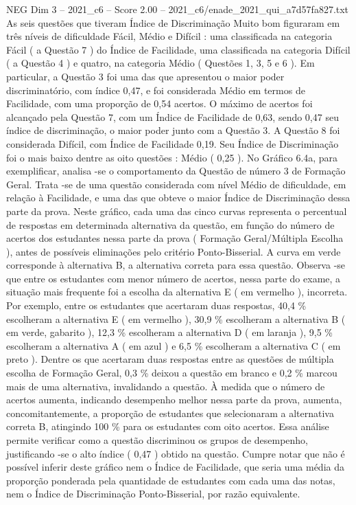 \begin{textsample}{NEG Dim 3 – 2021\_c6 – Score 2.00 – 2021\_c6/enade\_2021\_qui\_a7d57fa827.txt}
As seis questões que tiveram Índice de Discriminação Muito bom figuraram em três níveis de dificuldade Fácil, Médio e Difícil : uma classificada na categoria Fácil ( a Questão 7 ) do Índice de Facilidade, uma classificada na categoria Difícil ( a Questão 4 ) e quatro, na categoria Médio ( Questões 1, 3, 5 e 6 ).
Em particular, a Questão 3 foi uma das que apresentou o maior poder discriminatório, com índice 0,47, e foi considerada Médio em termos de Facilidade, com uma proporção de 0,54 acertos.
O máximo de acertos foi alcançado pela Questão 7, com um Índice de Facilidade de 0,63, sendo 0,47 seu índice de discriminação, o maior poder junto com a Questão 3.
A Questão 8 foi considerada Difícil, com Índice de Facilidade 0,19.
Seu Índice de Discriminação foi o mais baixo dentre as oito questões : Médio ( 0,25 ).
No Gráfico 6.4a, para exemplificar, analisa -se o comportamento da Questão de número 3 de Formação Geral.
Trata -se de uma questão considerada com nível Médio de dificuldade, em relação à Facilidade, e uma das que obteve o maior Índice de Discriminação dessa parte da prova.
Neste gráfico, cada uma das cinco curvas representa o percentual de respostas em determinada alternativa da questão, em função do número de acertos dos estudantes nessa parte da prova ( Formação Geral/Múltipla Escolha ), antes de possíveis eliminações pelo critério Ponto-Bisserial.
A curva em verde corresponde à alternativa B, a alternativa correta para essa questão.
Observa -se que entre os estudantes com menor número de acertos, nessa parte do exame, a situação mais frequente foi a escolha da alternativa E ( em vermelho ), incorreta.
Por exemplo, entre os estudantes que acertaram duas respostas, 40,4 \% escolheram a alternativa E ( em vermelho ), 30,9 \% escolheram a alternativa B ( em verde, gabarito ), 12,3 \% escolheram a alternativa D ( em laranja ), 9,5 \% escolheram a alternativa A ( em azul ) e 6,5 \% escolheram a alternativa C ( em preto ).
Dentre os que acertaram duas respostas entre as questões de múltipla escolha de Formação Geral, 0,3 \% deixou a questão em branco e 0,2 \% marcou mais de uma alternativa, invalidando a questão.
À medida que o número de acertos aumenta, indicando desempenho melhor nessa parte da prova, aumenta, concomitantemente, a proporção de estudantes que selecionaram a alternativa correta B, atingindo 100 \% para os estudantes com oito acertos.
Essa análise permite verificar como a questão discriminou os grupos de desempenho, justificando -se o alto índice ( 0,47 ) obtido na questão.
Cumpre notar que não é possível inferir deste gráfico nem o Índice de Facilidade, que seria uma média da proporção ponderada pela quantidade de estudantes com cada uma das notas, nem o Índice de Discriminação Ponto-Bisserial, por razão equivalente.

\end{textsample}
